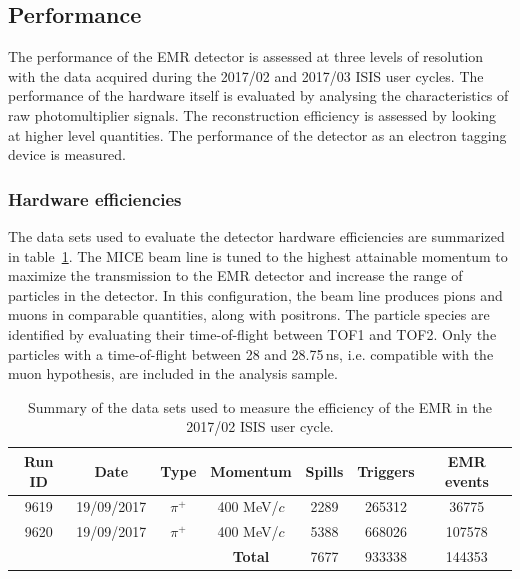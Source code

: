 \subsection{Performance}
\label{SubSect:EMR_Performance}

The performance of the EMR detector is assessed at three levels of resolution with the data acquired during the 2017/02 and 2017/03 ISIS user cycles. The performance of the hardware itself is evaluated by analysing the characteristics of raw photomultiplier signals. The reconstruction efficiency is assessed by looking at higher level quantities. The performance of the detector as an electron tagging device is measured.

\subsubsection{Hardware efficiencies}
The data sets used to evaluate the detector hardware efficiencies are summarized in table~\ref{tab:emr_eff_data_sets}. The MICE beam line is tuned to the highest attainable momentum to maximize the transmission to the EMR detector and increase the range of particles in the detector. In this configuration, the beam line produces pions and muons in comparable quantities, along with positrons. The particle species are identified by evaluating their time-of-flight between TOF1 and TOF2.
Only the particles with a time-of-flight between 28 and 28.75\,ns, i.e. compatible with the muon hypothesis, are included in the analysis sample.

\begin{table}[htb!]
	\centering
	\begin{tabular}{c|c|c|c|c|c|c}
		Run ID & Date & Type & Momentum & Spills & Triggers & EMR events \\
		\hline
		9619 & 19/09/2017 & $\pi^+$ & 400 MeV/$c$ & 2289 & 265312 & 36775 \\
		9620 & 19/09/2017 & $\pi^+$ & 400 MeV/$c$ & 5388 & 668026 & 107578 \\
		\hline
		\multicolumn{3}{c}{} & \textbf{Total} & 7677 & 933338 & 144353
	\end{tabular}
	\caption{Summary of the data sets used to measure the efficiency of the EMR in the 2017/02 ISIS user cycle.}
	\label{tab:emr_eff_data_sets}
\end{table}

